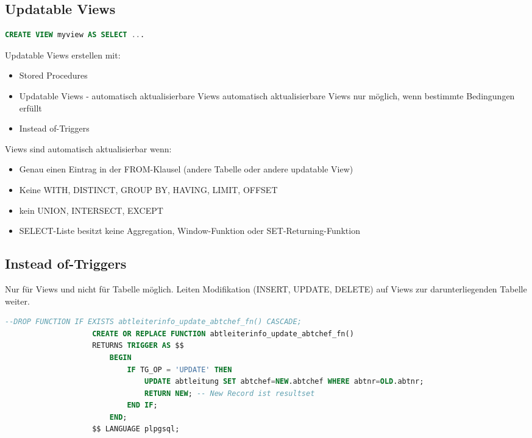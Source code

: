 \documentclass[a4paper, landscape, 8pt]{scrartcl}
\begin{document}
\begin{multicols*}{4}
        \section{Updatable Views}
        \begin{lstlisting}[language=sql]
                    CREATE VIEW myview AS SELECT ...
        \end{lstlisting}
        Updatable Views erstellen mit:
        \begin{itemize}
            \item Stored Procedures
            \item Updatable Views - automatisch aktualisierbare Views
            \subitem automatisch aktualisierbare Views
            \subitem nur möglich, wenn bestimmte Bedingungen erfüllt
            \item Instead of-Triggers
        \end{itemize}

        Views sind automatisch aktualisierbar wenn:
        \begin{itemize}
            \item Genau einen Eintrag in der FROM-Klausel (andere Tabelle oder andere updatable View)
            \item Keine WITH, DISTINCT, GROUP BY, HAVING, LIMIT, OFFSET
            \item kein UNION, INTERSECT, EXCEPT
            \item SELECT-Liste besitzt keine Aggregation, Window-Funktion oder SET-Returning-Funktion
        \end{itemize}

        \subsection{Instead of-Triggers}
        Nur für Views und nicht für Tabelle möglich.
        Leiten Modifikation (INSERT, UPDATE, DELETE) auf Views zur darunterliegenden Tabelle weiter.

        \begin{lstlisting}[language=sql]
                    --DROP FUNCTION IF EXISTS abtleiterinfo_update_abtchef_fn() CASCADE;
                    CREATE OR REPLACE FUNCTION abtleiterinfo_update_abtchef_fn()
                    RETURNS TRIGGER AS $$
                        BEGIN
                            IF TG_OP = 'UPDATE' THEN
                                UPDATE abtleitung SET abtchef=NEW.abtchef WHERE abtnr=OLD.abtnr;
                                RETURN NEW; -- New Record ist resultset
                            END IF;
                        END;
                    $$ LANGUAGE plpgsql;


\end{lstlisting}
\end{multicols*}
\end{document}
